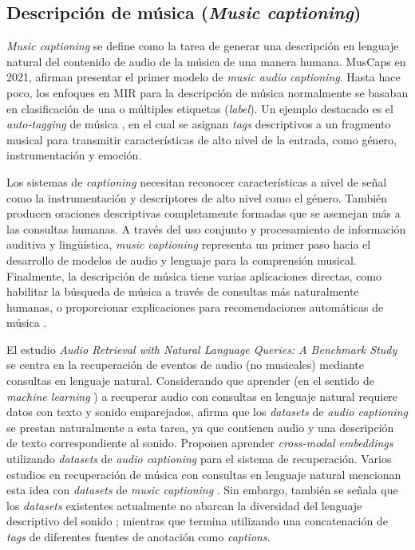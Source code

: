 \subsection{Descripción de música (\textit{Music captioning})}
\label{subsec:music_captioning}
\textit{Music captioning} se define como la tarea de generar una descripción en lenguaje natural del contenido de audio de la música de una manera humana.
MusCaps \cite{Manco2021MusCapsGC} en 2021, afirman presentar el primer modelo de \textit{music audio captioning}. Hasta hace poco, los enfoques en MIR para la descripción de música normalmente se basaban en clasificación de una o múltiples etiquetas (\textit{label}). Un ejemplo destacado es el \textit{auto-tagging} de música \cite{Choi2016AutomaticTU, Lee2017SamplelevelDC, Pons2017EndtoendLF}, en el cual se asignan \textit{tags} descriptivos a un fragmento musical para transmitir características de alto nivel de la entrada, como género, instrumentación y emoción.

Los sistemas de \textit{captioning} necesitan reconocer características a nivel de señal como la instrumentación y descriptores de alto nivel como el género. También producen oraciones descriptivas completamente formadas que se asemejan más a las consultas humanas. A través del uso conjunto y procesamiento de información auditiva y lingüística, \textit{music captioning} representa un primer paso hacia el desarrollo de modelos de audio y lenguaje para la comprensión musical. Finalmente, la descripción de música tiene varias aplicaciones directas, como habilitar la búsqueda de música a través de consultas más naturalmente humanas, o proporcionar explicaciones para recomendaciones automáticas de música \cite{Manco2021MusCapsGC}.

El estudio \textit{Audio Retrieval with Natural Language Queries: A Benchmark Study} \cite{Koepke2021AudioRW} se centra en la recuperación de eventos de audio (no musicales) mediante consultas en lenguaje natural. Considerando que aprender (en el sentido de  \textit{machine learning} ) a recuperar audio con consultas en lenguaje natural requiere datos con texto y sonido emparejados, \cite{Koepke2021AudioRW} afirma que los \textit{datasets} de \textit{audio captioning} se prestan naturalmente a esta tarea, ya que contienen audio y una descripción de texto correspondiente al sonido. Proponen aprender \textit{cross-modal embeddings} utilizando \textit{datasets} de \textit{audio captioning} para el sistema de recuperación. Varios estudios en recuperación de música con consultas en lenguaje natural mencionan esta idea con \textit{datasets} de \textit{music captioning} \cite{Doh2022TowardUT, Manco2022ContrastiveAL, Huang2022MuLanAJ}. Sin embargo, también se señala que los \textit{datasets} existentes actualmente no abarcan la diversidad del lenguaje descriptivo del sonido \cite{Huang2022MuLanAJ}; mientras que \cite{Doh2022TowardUT} termina utilizando una concatenación de \textit{tags} de diferentes fuentes de anotación como \textit{captions}.
